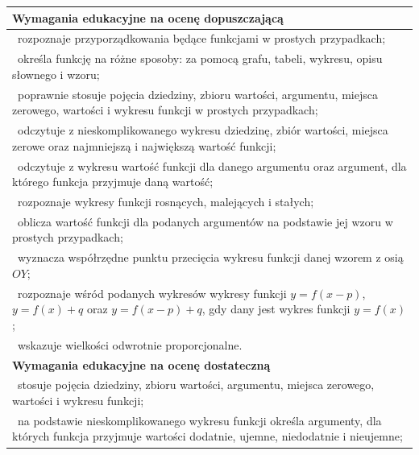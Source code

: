 \documentclass[12pt,a4paper]{article}
\begin{document}
	\begin{longtable}{|p{16cm}|}
		\hline
		
		\textbf{Wymagania edukacyjne na ocenę dopuszczającą} \\ \hline
		
		\textbullet\ rozpoznaje przyporządkowania będące funkcjami w prostych przypadkach; \\
		
		\textbullet\ określa funkcję na różne sposoby: za pomocą grafu, tabeli, wykresu, opisu słownego i wzoru; \\
		
		\textbullet\ poprawnie stosuje pojęcia dziedziny, zbioru wartości, argumentu, miejsca zerowego, wartości i wykresu funkcji w prostych przypadkach; \\
		
		\textbullet\ odczytuje z nieskomplikowanego wykresu dziedzinę, zbiór wartości, miejsca zerowe oraz najmniejszą i największą wartość funkcji; \\
		
		\textbullet\ odczytuje z wykresu wartość funkcji dla danego argumentu oraz argument, dla którego funkcja przyjmuje daną wartość; \\
		
		\textbullet\ rozpoznaje wykresy funkcji rosnących, malejących i stałych; \\
		
		\textbullet\ oblicza wartość funkcji dla podanych argumentów na podstawie jej wzoru w prostych przypadkach; \\
		
		\textbullet\ wyznacza współrzędne punktu przecięcia wykresu funkcji danej wzorem z osią $OY$; \\
		
		\textbullet\ rozpoznaje wśród podanych wykresów wykresy funkcji $y=f(x-p)$, $y=f(x)+q$ oraz $y=f(x-p)+q$, gdy dany jest wykres funkcji $y=f(x)$; \\
		
		\textbullet\ wskazuje wielkości odwrotnie proporcjonalne. \\ \hline
		
		\textbf{Wymagania edukacyjne na ocenę dostateczną} \\ \hline
		
		\textbullet\ stosuje pojęcia dziedziny, zbioru wartości, argumentu, miejsca zerowego, wartości i wykresu funkcji; \\
		
		\textbullet\ na podstawie nieskomplikowanego wykresu funkcji określa argumenty, dla których funkcja przyjmuje wartości dodatnie, ujemne, niedodatnie i nieujemne; \\
		

\end{longtable}
\end{document}
